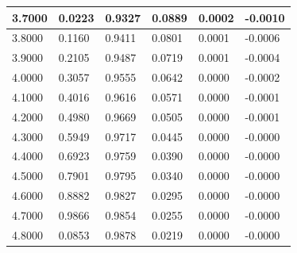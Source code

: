 \documentclass{article}
\begin{document}
\begin{table}[H]
\begin{tabular}{|l|l|l|l|l|l|}
    3.7000    &  0.0223   &     0.9327   &     0.0889   &     0.0002   &    -0.0010\\\hline
    3.8000    &  0.1160   &     0.9411   &     0.0801   &     0.0001   &    -0.0006\\\hline
    3.9000    &  0.2105   &     0.9487   &     0.0719   &     0.0001   &    -0.0004\\\hline
    4.0000    &  0.3057   &     0.9555   &     0.0642   &     0.0000   &    -0.0002\\\hline
    4.1000    &  0.4016   &     0.9616   &     0.0571   &     0.0000   &    -0.0001\\\hline
    4.2000    &  0.4980   &     0.9669   &     0.0505   &     0.0000   &    -0.0001\\\hline
    4.3000    &  0.5949   &     0.9717   &     0.0445   &     0.0000   &    -0.0000\\\hline
    4.4000    &  0.6923   &     0.9759   &     0.0390   &     0.0000   &    -0.0000\\\hline
    4.5000    &  0.7901   &     0.9795   &     0.0340   &     0.0000   &    -0.0000\\\hline
    4.6000    &  0.8882   &     0.9827   &     0.0295   &     0.0000   &    -0.0000\\\hline
    4.7000    &  0.9866   &     0.9854   &     0.0255   &     0.0000   &    -0.0000\\\hline
    4.8000    &  0.0853   &     0.9878   &     0.0219   &     0.0000   &    -0.0000\\\hline
    \end{tabular}
\end{table}
        
\end{document}
